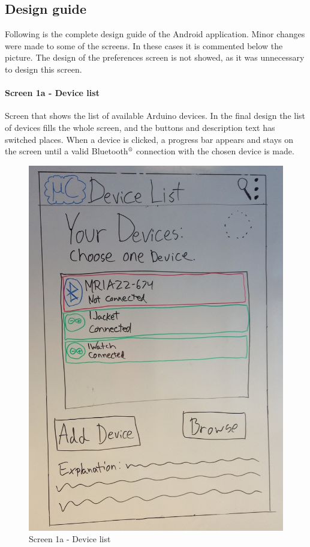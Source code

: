 \subsection{Design guide}
Following is the complete design guide of the Android application. Minor changes were made to some of the screens. In these cases it is commented below the picture. The design of the preferences screen is not showed, as it was unnecessary to design this screen.

\paragraph{Screen 1a - Device list}
Screen that shows the list of available Arduino devices. In the final design the list of devices fills the whole screen, and the buttons and description text has switched places. When a device is clicked, a progress bar appears and stays on the screen until a valid Bluetooth$\textsuperscript{\textregistered}$ connection with the chosen device is made.

\begin{figure}[H]
	\centering
		\includegraphics[scale=0.2]{images/Design_guide/Screen1a.png}
	\caption{Screen 1a - Device list}
	\label{fig:screen1a}
\end{figure}


